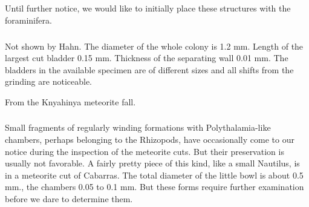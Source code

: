 \documentclass[a4paper, 12pt, oneside]{article}
\begin{document}
Until further notice, we would like to initially place these structures with the foraminifera.
\paragraph{\large{}}
\subparagraph{}
Not shown by Hahn. The diameter of the whole colony is 1.2 mm. Length of the largest cut bladder 0.15 mm. Thickness of the separating wall 0.01 mm. The bladders in the available specimen are of different sizes and all shifts from the grinding are noticeable.

From the Knyahinya meteorite fall.
\subsubsection{}
\paragraph*{}
Small fragments of regularly winding formations with Polythalamia-like chambers, perhaps belonging to the Rhizopods, have occasionally come to our notice during the inspection of the meteorite cuts. But their preservation is usually not favorable. A fairly pretty piece of this kind, like a small Nautilus, is in a meteorite cut of Cabarras. The total diameter of the little bowl is about 0.5 mm., the chambers 0.05 to 0.1 mm. But these forms require further examination before we dare to determine them.
\clearpage
\subsection{}
\subsubsection{}
\end{document}
